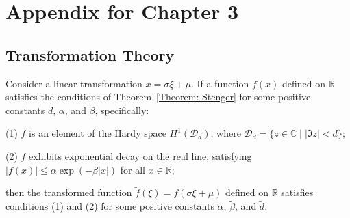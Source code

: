 \chapter{Appendix for Chapter 3}

\section{Transformation Theory}\label{Appendix: theorem 3}
\begin{theorem} \label{Theorem: transformation of normalization}
Consider a linear transformation $x=\sigma \xi + \mu$. If a function $f(x)$ defined on $\mathbb{R}$ satisfies the conditions of Theorem~\ref{Theorem: Stenger} for some positive constants $d$, $\alpha$, and $\beta$, specifically:

(1) $f$ is an element of the Hardy space $H^1(\mathcal{D}_d)$, where $\mathcal{D}_d=\{z\in \mathbb{C} \mid |\Im z|<d\}$;

(2) $f$ exhibits exponential decay on the real line, satisfying $|f(x)| \leq \alpha \exp (-\beta|x|)$ for all $x \in \mathbb{R}$;

then the transformed function $\tilde{f}(\xi)=f(\sigma\xi+\mu)$ defined on $\mathbb{R}$ satisfies conditions (1) and (2) for some positive constants $\tilde{\alpha}$, $\tilde{\beta}$, and $\tilde{d}$.
\end{theorem}

